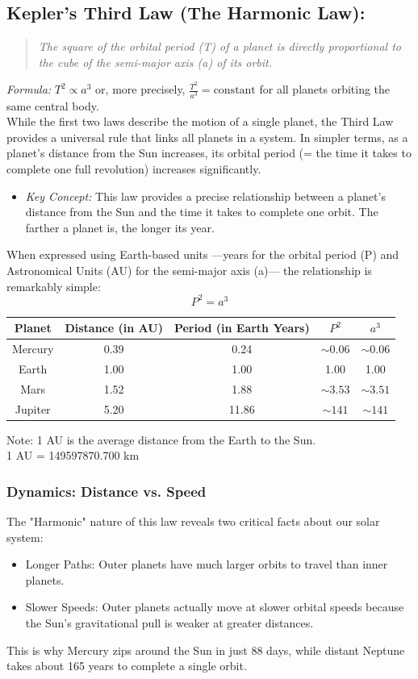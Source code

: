 \documentclass[a4paper,10pt]{article}
\begin{document}
\subsection{Kepler's Third Law (The Harmonic Law):}
\begin{quote}
\textit{The square of the orbital period (\emph{T}) of a planet is directly proportional to the cube of the semi-major axis (\emph{a}) of its orbit.}
\end{quote}
\emph{Formula:} \( T^2 \propto a^3 \) or, more precisely, \( \frac{T^2}{a^3} = \text{constant} \) for all planets orbiting the same central body.\\
While the first two laws describe the motion of a single planet, the Third Law provides a universal rule that links all planets in a system. In simpler terms, as a planet’s distance from the Sun increases, its orbital period (= the time it takes to complete one full revolution) increases significantly.
\begin{itemize}
\item \emph{Key Concept:} This law provides a precise relationship between a planet's distance from the Sun and the time it takes to complete one orbit. The farther a planet is, the longer its year.
\end{itemize}
When expressed using Earth-based units —years for the orbital period (P) and Astronomical Units (AU) for the semi-major axis (a)— the relationship is remarkably simple:
\[
 P^2 = a^3
\]
\begin{table}[h!]
\begin{center}
\begin{tabular}{|c|c|c|c|c|}
\hline
\textbf{Planet}& \textbf{Distance (in AU)}& \textbf{Period (in Earth Years)}& \(P^2\) & \(a^3\)\\
\hline
Mercury&0.39&0.24&\(\sim0.06\)&\(\sim0.06\)\\
\hline
Earth&1.00&1.00&1.00&1.00\\
\hline
Mars&1.52&1.88&\(\sim3.53\)&\(\sim3.51\)\\
\hline
Jupiter&5.20&11.86&\(\sim141\)&\(\sim141\)\\
\hline
\end{tabular}
\end{center}
\end{table}
Note: 1 AU is the average distance from the Earth to the Sun. \\
1 AU = 149597870.700 km\\
\subsubsection{Dynamics: Distance vs. Speed}
The "Harmonic" nature of this law reveals two critical facts about our solar system:
\begin{itemize}
\item Longer Paths: Outer planets have much larger orbits to travel than inner planets.
\item Slower Speeds: Outer planets actually move at slower orbital speeds because the Sun's gravitational pull is weaker at greater distances.
\end{itemize}
This is why Mercury zips around the Sun in just 88 days, while distant Neptune takes about 165 years to complete a single orbit.
\end{document}
